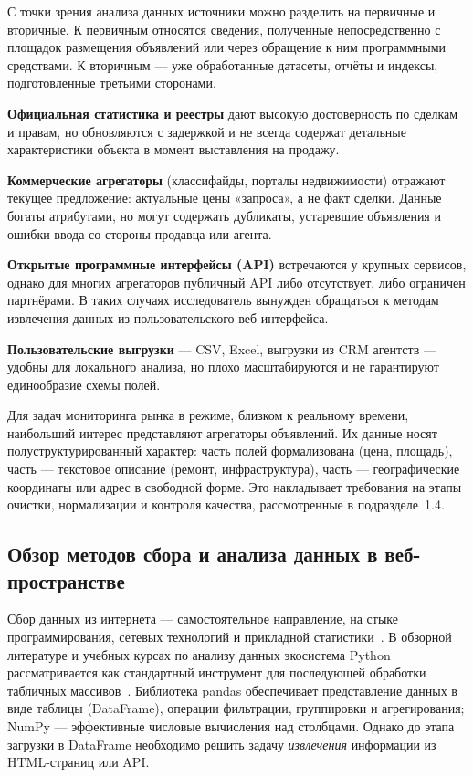 С точки зрения анализа данных источники можно разделить на первичные и вторичные. К первичным относятся сведения, полученные непосредственно с площадок размещения объявлений или через обращение к ним программными средствами. К вторичным --- уже обработанные датасеты, отчёты и индексы, подготовленные третьими сторонами.

\textbf{Официальная статистика и реестры} дают высокую достоверность по сделкам и правам, но обновляются с задержкой и не всегда содержат детальные характеристики объекта в момент выставления на продажу.

\textbf{Коммерческие агрегаторы} (классифайды, порталы недвижимости) отражают текущее предложение: актуальные цены «запроса», а не факт сделки. Данные богаты атрибутами, но могут содержать дубликаты, устаревшие объявления и ошибки ввода со стороны продавца или агента.

\textbf{Открытые программные интерфейсы (API)} встречаются у крупных сервисов, однако для многих агрегаторов публичный API либо отсутствует, либо ограничен партнёрами. В таких случаях исследователь вынужден обращаться к методам извлечения данных из пользовательского веб-интерфейса.

\textbf{Пользовательские выгрузки} --- CSV, Excel, выгрузки из CRM агентств --- удобны для локального анализа, но плохо масштабируются и не гарантируют единообразие схемы полей.

Для задач мониторинга рынка в режиме, близком к реальному времени, наибольший интерес представляют агрегаторы объявлений. Их данные носят полуструктурированный характер: часть полей формализована (цена, площадь), часть --- текстовое описание (ремонт, инфраструктура), часть --- географические координаты или адрес в свободной форме. Это накладывает требования на этапы очистки, нормализации и контроля качества, рассмотренные в подразделе~1.4.

\subsection{Обзор методов сбора и анализа данных в веб-пространстве}

Сбор данных из интернета --- самостоятельное направление, на стыке программирования, сетевых технологий и прикладной статистики~\cite{scraping-habr}. В обзорной литературе и учебных курсах по анализу данных экосистема Python рассматривается как стандартный инструмент для последующей обработки табличных массивов~\cite{mckinney2023,vanderplas2023,coursera-python,pandas-docs}. Библиотека pandas обеспечивает представление данных в виде таблицы (DataFrame), операции фильтрации, группировки и агрегирования; NumPy --- эффективные числовые вычисления над столбцами. Однако до этапа загрузки в DataFrame необходимо решить задачу \emph{извлечения} информации из HTML-страниц или API.

